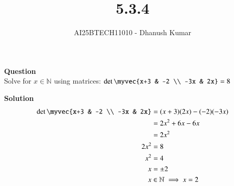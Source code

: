 \documentclass[journal]{IEEEtran}
\begin{document}
\title{5.3.4}
\author{AI25BTECH11010 - Dhanush Kumar}
\maketitle
\renewcommand{\thefigure}{\theenumi}
\renewcommand{\thetable}{\theenumi}

\textbf{Question}\\


Solve for $x \in \mathbb{N}$ using matrices:
$
\det\myvec{x+3 & -2 \\ -3x & 2x} = 8
$

\textbf{Solution}\\
\begin{align}
\det\myvec{x+3 & -2 \\ -3x & 2x} 
&= (x+3)(2x) - (-2)(-3x) \\
&= 2x^2 + 6x - 6x \\
&= 2x^2 \\
2x^2 &= 8 \\
x^2 &= 4 \\
x &= \pm 2 \\
x &\in \mathbb{N} \implies x = 2
\end{align}
\end{document}
